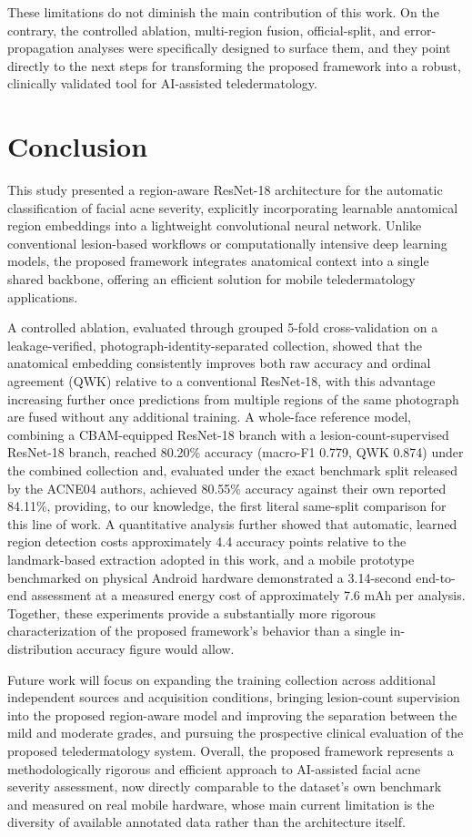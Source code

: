 \documentclass[conference]{IEEEtran}
\begin{document}
These limitations do not diminish the main contribution of this work. On the contrary, the controlled ablation, multi-region fusion, official-split, and error-propagation analyses were specifically designed to surface them, and they point directly to the next steps for transforming the proposed framework into a robust, clinically validated tool for AI-assisted teledermatology.


\section{Conclusion}
This study presented a region-aware ResNet-18 architecture for the automatic classification of facial acne severity, explicitly incorporating learnable anatomical region embeddings into a lightweight convolutional neural network. Unlike conventional lesion-based workflows or computationally intensive deep learning models, the proposed framework integrates anatomical context into a single shared backbone, offering an efficient solution for mobile teledermatology applications.

A controlled ablation, evaluated through grouped 5-fold cross-validation on a leakage-verified, photograph-identity-separated collection, showed that the anatomical embedding consistently improves both raw accuracy and ordinal agreement (QWK) relative to a conventional ResNet-18, with this advantage increasing further once predictions from multiple regions of the same photograph are fused without any additional training. A whole-face reference model, combining a CBAM-equipped ResNet-18 branch with a lesion-count-supervised ResNet-18 branch, reached 80.20\% accuracy (macro-F1 0.779, QWK 0.874) under the combined collection and, evaluated under the exact benchmark split released by the ACNE04 authors, achieved 80.55\% accuracy against their own reported 84.11\%, providing, to our knowledge, the first literal same-split comparison for this line of work. A quantitative analysis further showed that automatic, learned region detection costs approximately 4.4 accuracy points relative to the landmark-based extraction adopted in this work, and a mobile prototype benchmarked on physical Android hardware demonstrated a 3.14-second end-to-end assessment at a measured energy cost of approximately 7.6 mAh per analysis. Together, these experiments provide a substantially more rigorous characterization of the proposed framework's behavior than a single in-distribution accuracy figure would allow.

Future work will focus on expanding the training collection across additional independent sources and acquisition conditions, bringing lesion-count supervision into the proposed region-aware model and improving the separation between the mild and moderate grades, and pursuing the prospective clinical evaluation of the proposed teledermatology system. Overall, the proposed framework represents a methodologically rigorous and efficient approach to AI-assisted facial acne severity assessment, now directly comparable to the dataset's own benchmark and measured on real mobile hardware, whose main current limitation is the diversity of available annotated data rather than the architecture itself.
\end{document}
